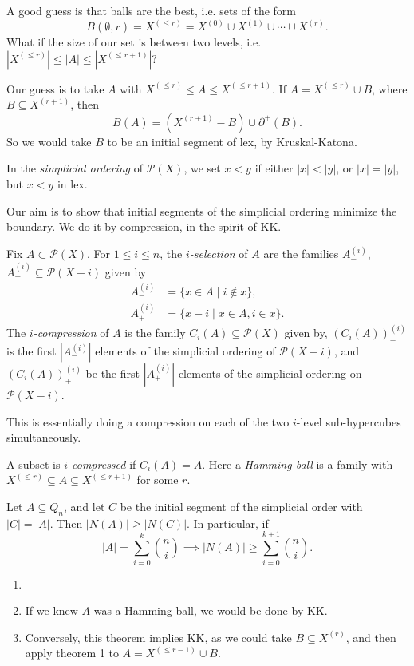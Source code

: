 \documentclass[12pt]{article}
\begin{document}
A good guess is that balls are the best, i.e. sets of the form
\[
B(\emptyset, r) = X^{(\leq r)} = X^{(0)} \cup X^{(1)} \cup \cdots \cup X^{(r)}.
\]
What if the size of our set is between two levels, i.e. $|X^{(\leq r)}| \leq |A| \leq |X^{(\leq r + 1)}|$?

Our guess is to take $A$ with $X^{(\leq r)} \leq A \leq X^{(\leq r + 1)}$. If $A = X^{(\leq r)} \cup B$, where $B \subseteq X^{(r + 1)}$, then
\[
B(A) = (X^{(r+1)} - B) \cup \partial^{+}(B).
\]
So we would take $B$ to be an initial segment of lex, by Kruskal-Katona.

In the \emph{simplicial ordering} of $\mathcal{P}(X)$, we set $x < y$ if either $|x| < |y|$, or $|x| = |y|$, but $x < y$ in lex.

Our aim is to show that initial segments of the simplicial ordering minimize the boundary. We do it by compression, in the spirit of KK.

Fix $A \subset \mathcal{P}(X)$. For $1 \leq i \leq n$, the \emph{$i$-selection} of $A$ are the families $A_-^{(i)}$, $A_+^{(i)} \subseteq \mathcal{P}(X - i)$ given by
\begin{align*}
	A_{-}^{(i)} &= \{x \in A \mid i \not \in x\}, \\
	A_{+}^{(i)} &= \{x-i \mid x \in A, i \in x\}.
\end{align*}
The \emph{$i$-compression} of $A$ is the family $C_i(A) \subseteq \mathcal{P}(X)$ given by, $(C_i(A))^{(i)}_{-}$ is the first $|A_{-}^{(i)}|$ elements of the simplicial ordering of $\mathcal{P}(X - i)$, and $(C_i(A))_{+}^{(i)}$ be the first $|A_{+}^{(i)}|$ elements of the simplicial ordering on $\mathcal{P}(X - i)$.

This is essentially doing a compression on each of the two $i$-level sub-hypercubes simultaneously.

A subset is \emph{$i$-compressed} if $C_i(A) = A$. Here a \emph{Hamming ball} is a family with $X^{(\leq r)} \subseteq A \subseteq X^{(\leq r + 1)}$ for some $r$.

\begin{theorem}
	Let $A \subseteq Q_n$, and let $C$ be the initial segment of the simplicial order with $|C| = |A|$. Then $|N(A)| \geq |N(C)|$. In particular, if
	\[
	|A| = \sum_{i = 0}^{k} \binom ni \implies |N(A)| \geq \sum_{i = 0}^{k + 1} \binom ni.
	\]
\end{theorem}

\begin{remark}
	\begin{enumerate}
		\item[]
		\item If we knew $A$ was a Hamming ball, we would be done by KK.
		\item Conversely, this theorem implies KK, as we could take $B \subseteq X^{(r)}$, and then apply theorem 1 to $A = X^{(\leq r - 1)} \cup B$.
	\end{enumerate}
\end{remark}
\end{document}
